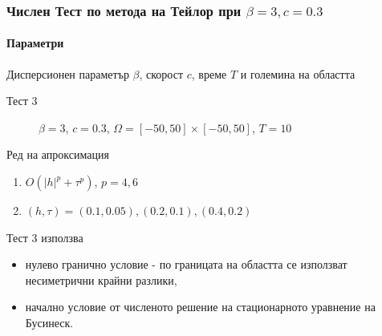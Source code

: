 \documentclass{beamer}
\begin{document}

\begin{frame}
\frametitle{Числен Тест по метода на Тейлор при $\beta = 3, c=0.3$}
\framesubtitle{Параметри}

Дисперсионен параметър $\beta$, скорост $c$, време $T$ и големина на областта
\begin{description}
 \item[Тест 3] $\beta = 3$, $c = 0.3$, $\Omega = [-50, 50] \times [-50, 50]$, $T = 10$
\end{description}

Ред на апроксимация
\begin{enumerate}
  \item $O(|h|^p + \tau^p)$, $p = 4, 6$
  \item $(h, \tau)=(0.1, 0.05), (0.2, 0.1), (0.4, 0.2)$
\end{enumerate}

Тест 3 използва 
\begin{itemize} 
\item нулево гранично условие - по границата на областта се използват несиметрични крайни разлики,
\item начално условие от численото решение на стационарното уравнение на Бусинеск.
\end{itemize}
\end{frame}
\end{document}
